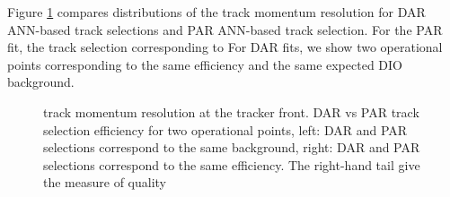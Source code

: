 Figure \ref{fig:dar_vs_par_ann} compares distributions of the track momentum resolution for DAR ANN-based track
selections and PAR ANN-based track selection. For the PAR fit, the track selection corresponding to For DAR fits, 
we show two operational points corresponding to the same efficiency and the same expected DIO background.

\begin{figure}
\hspace{-1.4in}
\caption{
  \label{fig:dar_vs_par_ann}
  track momentum resolution at the tracker front. 
  DAR vs PAR track selection efficiency for two operational points, left: DAR and PAR selections correspond to the same background, 
  right: DAR and PAR selections correspond to the same efficiency. The right-hand tail give the measure of quality 
}
\end{figure}


